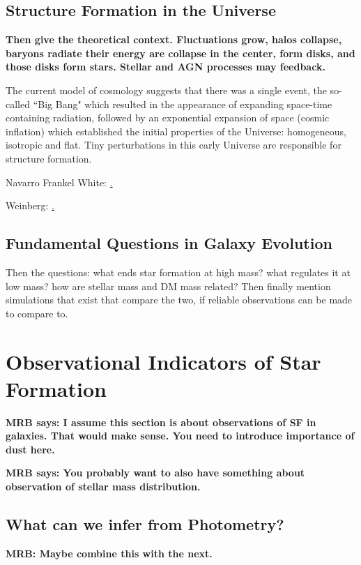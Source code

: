 \subsection{Structure Formation in the Universe}
{\bf Then give the theoretical context.
Fluctuations grow, halos collapse, baryons radiate their
energy are collapse in the center, form disks, and those
disks form stars. Stellar and AGN processes may feedback.}

The current model of cosmology suggests that there was a single event, the so-called ``Big Bang" which resulted in the appearance of expanding space-time containing radiation, followed by an exponential expansion of space (cosmic inflation) which established the initial properties of the Universe: homogeneous, isotropic and flat. Tiny perturbations in this early Universe are responsible for structure formation.

Navarro Frankel White: \href{http://iopscience.iop.org/article/10.1086/304888/meta}.

Weinberg: \href{https://www.pnas.org/content/112/40/12249#ref-4}.



\subsection{Fundamental Questions in Galaxy Evolution}
{Then the questions: what ends star formation at high mass?
what  regulates it at low mass? how are 
stellar mass and DM mass related? Then finally mention
simulations that exist that compare the two, if reliable
observations can be made to compare to.}

\section{Observational Indicators of Star Formation}

{\bf MRB says: I assume this section is about observations 
of SF in galaxies. That would make sense. You need to 
introduce importance of dust here.}

{\bf MRB says: You probably want to also have something
about observation of stellar mass distribution.}

\subsection{What can we infer from Photometry?}

{\bf MRB: Maybe combine this with the next.}


